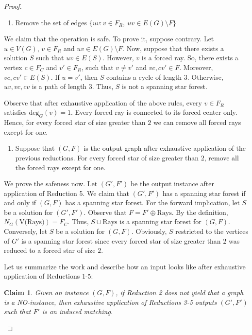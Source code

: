 \documentclass[en]{pracamgr}
\newtheorem{claim}{Claim}
\theoremstyle{definition}
\newcommand{\ssf}{spanning star forest}
\newcommand{\degree}[2]{\textrm{deg}_{#1}(#2)}
\begin{document}
\begin{proof}
	\begin{enumerate}[leftmargin=*,label=\textbf{Reduction \arabic{enumi}},resume,wide, labelwidth=!, labelindent=0pt]
		\item Remove the set of edges $\{uv: v \in F_R,\ uv \in E(G) \setminus F\}$
	\end{enumerate}
	We claim that the operation is safe. To prove it, suppose contrary. Let $u \in V(G)$, $v \in F_R$ and $uv \in E(G) \setminus F$. Now, suppose that there exists a solution $S$ such that $uv \in E(S)$. However, $v$ is a forced ray. So, there exists a vertex $c \in F_C$ and $v' \in F_R$, such that $v \neq v'$ and $vc,cv' \in F$. Moreover, $vc,cv' \in E(S)$. If $u=v'$, then $S$ contains a cycle of length $3$. Otherwise, $uv,vc,cv$ is a path of length $3$. Thus, $S$ is not a spanning star forest.

	Observe that after exhaustive application of the above rules, every $v \in F_R$ satisfies $\degree{G}{v}=1$. Every forced ray is connected to its forced center only. Hence, for every forced star of size greater than $2$ we can remove all forced rays except for one.


	\begin{enumerate}[leftmargin=*,label=\textbf{Reduction \arabic{enumi}},resume,wide, labelwidth=!, labelindent=0pt]
		\item Suppose that $(G,F)$ is the output graph after exhaustive application of the previous reductions. For every forced star of size greater than $2$, remove all the forced rays except for one.
	\end{enumerate}

	We prove the safeness now. Let $(G',F')$ be the output instance after application of Reduction 5. We claim that $(G',F')$ has a \ssf{} if and only if $(G,F)$ has a \ssf{}. For the forward implication, let $S$ be a solution for $(G',F')$. Observe that $F = F' \oplus \textrm{Rays}$. By the definition, $N_G(\textrm{V(Rays)}) = F_C$. Thus, $S \cup \textrm{Rays}$ is a \ssf{} for $(G,F)$. Conversely, let $S$ be a solution for $(G,F)$. Obviously, $S$ restricted to the vertices of $G'$ is a spanning star forest since every forced star of size greater than $2$ was reduced to a forced star of size $2$.

	Let us summarize the work and describe how an input looks like after exhaustive application of Reductions 1-5:

	\begin{claim}
		Given an instance $(G,F)$, if Reduction 2 does not yield that a graph is a NO-instance, then exhaustive application of Reductions 3-5 outputs $(G',F')$ such that $F'$ is an induced matching.
	\end{claim}
	

\end{proof}
\end{document}
